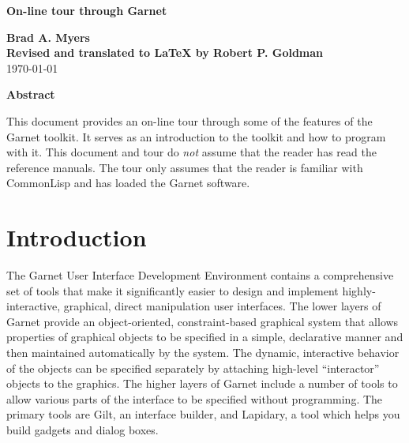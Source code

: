\begin{titlepage}
\vspace{0.6in}
\begin{center}
  {\Large \textbf{On-line tour through Garnet}}

  {\large {\bf Brad A. Myers}} \\
  \textbf{Revised and translated to LaTeX by Robert P. Goldman}\\
  \vspace{0.3in}
  \today{}
\end{center}
\vspace{\fill}
\begin{center}
{\bf Abstract}\end{center}

This document provides an on-line tour through some of the features of the
Garnet toolkit.  It serves as an introduction to the toolkit and how to
program with it.  This document and tour do {\it not} assume that the reader
has read the reference manuals.  The tour only assumes that the reader is
familiar with CommonLisp and has loaded the Garnet software.

\vspace{0.5in}

\end{titlepage}



%
\chapter{Introduction}
The Garnet User Interface Development Environment contains a comprehensive
set of tools that make it significantly easier to design and implement
highly-interactive, graphical, direct manipulation user interfaces.  The
lower layers of Garnet provide an object-oriented, constraint-based
graphical system that allows properties of graphical objects to be
specified in a simple, declarative manner and then maintained automatically
by the system.  The dynamic, interactive behavior of the objects can be
specified separately by attaching high-level ``interactor'' objects to the
graphics.  The higher layers of Garnet include a number of tools to allow
various parts of the interface to be specified without programming.
The primary tools are Gilt, an interface builder, and Lapidary, a tool which
helps you build gadgets and dialog boxes.

